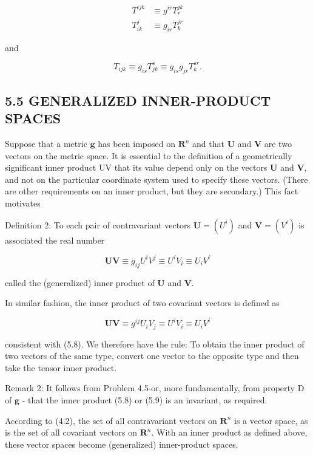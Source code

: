 \documentclass[10pt]{article}
\begin{document}
$$
\begin{aligned}
T^{i j k} & \equiv g^{i r} T_{r}^{j k} \\
T_{i k}^{j} & \equiv g_{i r} T_{k}^{j r}
\end{aligned}
$$

and

$$
T_{i j k} \equiv g_{i s} T_{j k}^{s} \equiv g_{i s} g_{j r} T_{k}^{s r} .
$$

\subsection*{5.5 GENERALIZED INNER-PRODUCT SPACES}
Suppose that a metric $\mathbf{g}$ has been imposed on $\mathbf{R}^{n}$ and that $\mathbf{U}$ and $\mathbf{V}$ are two vectors on the metric space. It is essential to the definition of a geometrically significant inner product UV that its value depend only on the vectors $\mathbf{U}$ and $\mathbf{V}$, and not on the particular coordinate system used to specify these vectors. (There are other requirements on an inner product, but they are secondary.) This fact motivates

Definition 2: To each pair of contravariant vectors $\mathbf{U}=\left(U^{i}\right)$ and $\mathbf{V}=\left(V^{i}\right)$ is associated the real number


\begin{equation*}
\mathbf{U V} \equiv g_{i j} U^{i} V^{j} \equiv U^{i} V_{i} \equiv U_{i} V^{i} \tag{5.8}
\end{equation*}


called the (generalized) inner product of $\mathbf{U}$ and $\mathbf{V}$.

In similar fashion, the inner product of two covariant vectors is defined as


\begin{equation*}
\mathbf{U} \mathbf{V} \equiv g^{i j} U_{i} V_{j} \equiv U^{i} V_{i} \equiv U_{i} V^{i} \tag{5.9}
\end{equation*}


consistent with (5.8). We therefore have the rule: To obtain the inner product of two vectors of the same type, convert one vector to the opposite type and then take the tensor inner product.

Remark 2: It follows from Problem 4.5-or, more fundamentally, from property D of $\mathbf{g}$ - that the inner product (5.8) or (5.9) is an invariant, as required.

According to (4.2), the set of all contravariant vectors on $\mathbf{R}^{n}$ is a vector space, as is the set of all covariant vectors on $\mathbf{R}^{n}$. With an inner product as defined above, these vector spaces become (generalized) inner-product spaces.
\end{document}

